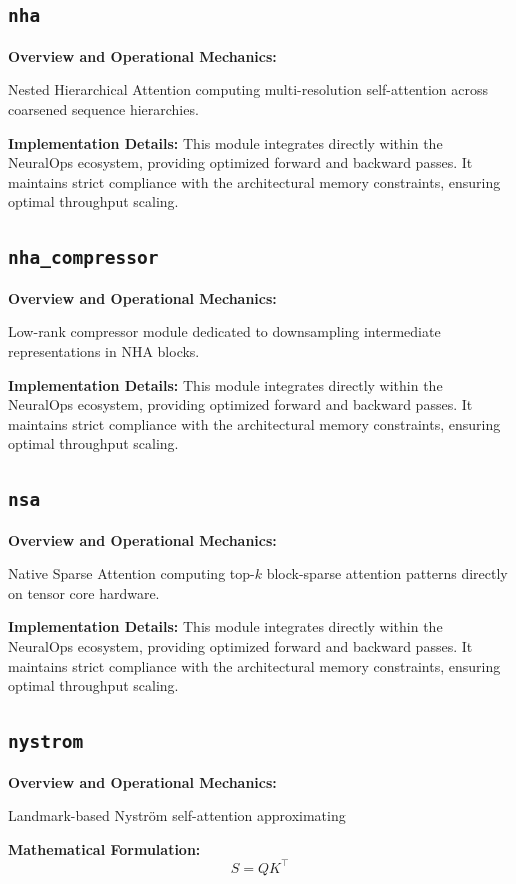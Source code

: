 \documentclass[10pt,twocolumn,letterpaper]{article}
\begin{document}
\subsection{\texttt{nha}}
\textbf{Overview and Operational Mechanics:}

Nested Hierarchical Attention computing multi-resolution self-attention across coarsened sequence hierarchies.

\textbf{Implementation Details:}
This module integrates directly within the NeuralOps ecosystem, providing optimized forward and backward passes. It maintains strict compliance with the architectural memory constraints, ensuring optimal throughput scaling.

\subsection{\texttt{nha\_compressor}}
\textbf{Overview and Operational Mechanics:}

Low-rank compressor module dedicated to downsampling intermediate representations in NHA blocks.

\textbf{Implementation Details:}
This module integrates directly within the NeuralOps ecosystem, providing optimized forward and backward passes. It maintains strict compliance with the architectural memory constraints, ensuring optimal throughput scaling.

\subsection{\texttt{nsa}}
\textbf{Overview and Operational Mechanics:}

Native Sparse Attention computing top-$k$ block-sparse attention patterns directly on tensor core hardware.

\textbf{Implementation Details:}
This module integrates directly within the NeuralOps ecosystem, providing optimized forward and backward passes. It maintains strict compliance with the architectural memory constraints, ensuring optimal throughput scaling.

\subsection{\texttt{nystrom}}
\textbf{Overview and Operational Mechanics:}

Landmark-based Nystr\"om self-attention approximating

\textbf{Mathematical Formulation:}
\begin{equation}
S = Q K^\top
\end{equation}
\end{document}
